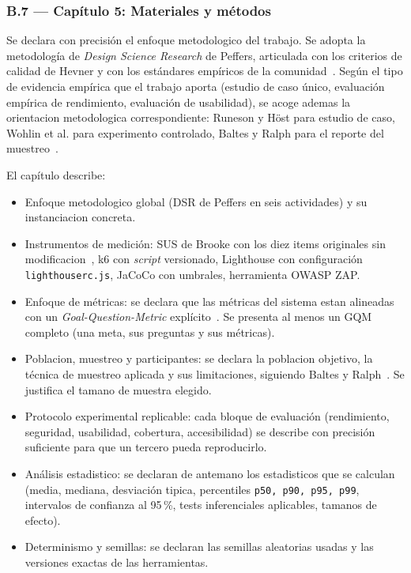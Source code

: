 \documentclass[11pt,a4paper]{article}
\begin{document}
\subsubsection*{B.7 --- Cap\'{i}tulo 5: Materiales y m\'{e}todos}

Se declara con precisi\'{o}n el enfoque metodologico del trabajo. Se adopta la metodolog\'{i}a de \emph{Design Science Research} de Peffers, articulada con los criterios de calidad de Hevner y con los est\'{a}ndares emp\'{i}ricos de la comunidad~\cite{peffers2007design,hevner2004design,ralph2021empirical}. Seg\'{u}n el tipo de evidencia emp\'{i}rica que el trabajo aporta (estudio de caso \'{u}nico, evaluaci\'{o}n emp\'{i}rica de rendimiento, evaluaci\'{o}n de usabilidad), se acoge ademas la orientacion metodologica correspondiente: Runeson y H\"ost para estudio de caso, Wohlin et al. para experimento controlado, Baltes y Ralph para el reporte del muestreo~\cite{runeson2009case,wohlin2012experimentation,baltes2022sampling}.

El cap\'{i}tulo describe:

\begin{itemize}
    \item Enfoque metodologico global (DSR de Peffers en seis actividades) y su instanciacion concreta.
    \item Instrumentos de medici\'{o}n: SUS de Brooke con los diez items originales sin modificacion~\cite{brooke1996sus}, k6 con \emph{script} versionado, Lighthouse con configuraci\'{o}n \texttt{lighthouserc.js}, JaCoCo con umbrales, herramienta OWASP ZAP.
    \item Enfoque de m\'{e}tricas: se declara que las m\'{e}tricas del sistema estan alineadas con un \emph{Goal-Question-Metric} expl\'{i}cito~\cite{basili1994gqm}. Se presenta al menos un GQM completo (una meta, sus preguntas y sus m\'{e}tricas).
    \item Poblacion, muestreo y participantes: se declara la poblacion objetivo, la t\'{e}cnica de muestreo aplicada y sus limitaciones, siguiendo Baltes y Ralph~\cite{baltes2022sampling}. Se justifica el tamano de muestra elegido.
    \item Protocolo experimental replicable: cada bloque de evaluaci\'{o}n (rendimiento, seguridad, usabilidad, cobertura, accesibilidad) se describe con precisi\'{o}n suficiente para que un tercero pueda reproducirlo.
    \item An\'{a}lisis estadistico: se declaran de antemano los estadisticos que se calculan (media, mediana, desviaci\'{o}n tipica, percentiles \texttt{p50, p90, p95, p99}, intervalos de confianza al 95\,\%, tests inferenciales aplicables, tamanos de efecto).
    \item Determinismo y semillas: se declaran las semillas aleatorias usadas y las versiones exactas de las herramientas.
\end{itemize}
\end{document}
